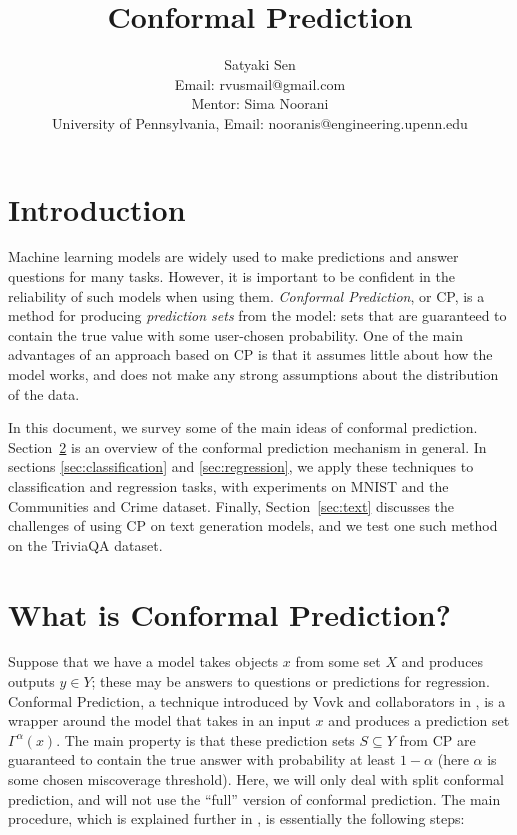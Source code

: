 \documentclass{scrartcl}
\title{Conformal Prediction}
\author{Satyaki Sen \\ 
\footnotesize{Email: {rvusmail@gmail.com}} \\
Mentor: Sima Noorani \\
\footnotesize{University of Pennsylvania, Email: {nooranis@engineering.upenn.edu}}}
\begin{document}
\maketitle


\section{Introduction}
Machine learning models are widely used to make predictions and answer questions for many tasks.
However, it is important to be confident in the reliability of such models when using them.
 \emph{Conformal Prediction}, or CP, is a method 
for producing \emph{prediction sets} from the model: sets that are guaranteed to contain the true value
with some user-chosen probability. One of the main advantages of an approach based on CP is that it assumes
little about how the model works, and does not make any strong assumptions about the distribution of the data.

In this document, we survey some of the main ideas of conformal prediction. Section~\ref{sec:cp} is an overview
of the conformal prediction mechanism in general. In sections \ref{sec:classification} and \ref{sec:regression}, we apply these techniques
to classification and regression tasks, with experiments on MNIST and the Communities and Crime dataset. 
Finally, Section~\ref{sec:text} discusses the challenges of using CP on text generation models, and we test one such method
on the TriviaQA dataset.
\section{What is Conformal Prediction?}
\label{sec:cp}

Suppose that we have a model takes objects $x$ from some set $X$
and produces outputs $y \in Y$; these may be answers to questions or predictions for regression. 
Conformal Prediction, a technique introduced by Vovk and collaborators in \cite{vovkbook},
is a wrapper around the model that takes in an input $x$ and produces a prediction set $\Gamma^{\alpha}(x)$.
The main property is that these prediction sets $S \subseteq Y$ from CP are guaranteed to contain
the true answer with probability at least $1 - \alpha$ (here $\alpha$ is some chosen miscoverage threshold).
Here, we will only deal with split conformal prediction, and will not use the ``full'' version of conformal prediction.
The main procedure, which is explained further in \cite{introcp}, is essentially the following steps:
\end{document}
